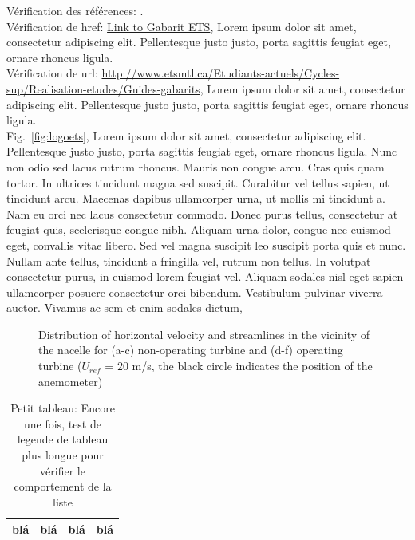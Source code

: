 \documentclass[letterpaper, twoside, 12pt, memoire, creativecommons, hyperref]{thETS}
\begin{document}
Vérification des références: \cite{Arica2002}.
\\
Vérification de href: \href{http://www.etsmtl.ca/Etudiants-actuels/Cycles-sup/Realisation-etudes/Guides-gabarits}{Link to Gabarit ETS}, Lorem ipsum dolor sit amet, consectetur adipiscing elit. Pellentesque justo justo, porta sagittis feugiat eget, ornare rhoncus ligula.
\\
Vérification de url: \url{http://www.etsmtl.ca/Etudiants-actuels/Cycles-sup/Realisation-etudes/Guides-gabarits}, Lorem ipsum dolor sit amet, consectetur adipiscing elit. Pellentesque justo justo, porta sagittis feugiat eget, ornare rhoncus ligula.
\\
Fig.~\ref{fig:logoets}, Lorem ipsum dolor sit amet, consectetur adipiscing elit. Pellentesque justo justo, porta sagittis feugiat eget, ornare rhoncus ligula. Nunc non odio sed lacus rutrum rhoncus. Mauris non congue arcu. Cras quis quam tortor. In ultrices tincidunt magna sed suscipit. Curabitur vel tellus sapien, ut tincidunt arcu. Maecenas dapibus ullamcorper urna, ut mollis mi tincidunt a. Nam eu orci nec lacus consectetur commodo. Donec purus tellus, consectetur at feugiat quis, scelerisque congue nibh. Aliquam urna dolor, congue nec euismod eget, convallis vitae libero. Sed vel magna suscipit leo suscipit porta quis et nunc. Nullam ante tellus, tincidunt a fringilla vel, rutrum non tellus. In volutpat consectetur purus, in euismod lorem feugiat vel. Aliquam sodales nisl eget sapien ullamcorper posuere consectetur orci bibendum. Vestibulum pulvinar viverra auctor. Vivamus ac sem et enim sodales dictum, 
%
\begin{figure}[ht]
	\centering
	\caption{Distribution of horizontal velocity and streamlines in the vicinity of the nacelle for (a-c) non-operating turbine and (d-f) operating turbine ($U_{ref}$ = 20 m/s, the black circle indicates the position of the anemometer)}
\end{figure}


\begin{table}[ht]
	\caption{Petit tableau: Encore une fois, test de legende de tableau plus longue pour vérifier le comportement de la liste}
		\begin{tabular}{|c|c|c|c|}
		\hline
			blá & blá & blá & blá \\
			\hline
		\end{tabular}
	\label{tab:UnTableau}
\end{table}
\end{document}
